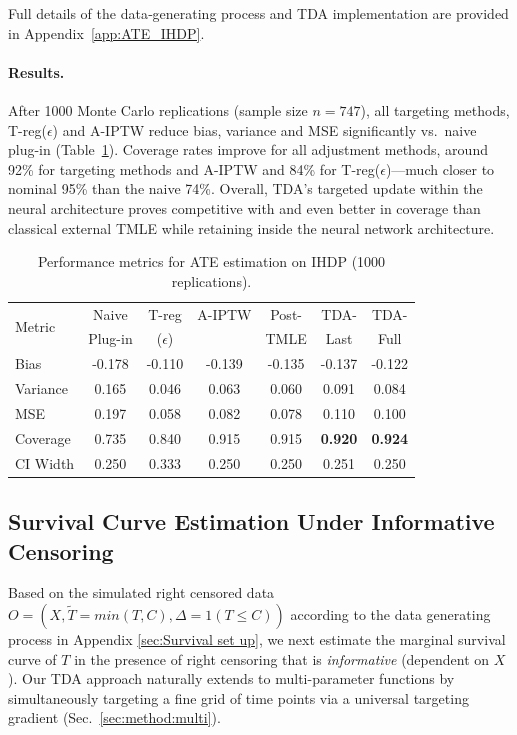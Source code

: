 \documentclass{article}
\theoremstyle{remark}
\begin{document}
Full details of the data‑generating process and TDA implementation are provided in Appendix~\ref{app:ATE_IHDP}.

\paragraph{Results.}
After 1000 Monte Carlo replications (sample size $n=747$), all targeting methods, T-reg($\epsilon$) and A-IPTW reduce bias, variance and MSE significantly vs.\ naive plug-in (Table~\ref{table:ate}). Coverage rates improve for all adjustment methods, around 92\% for targeting methods and A-IPTW and 84\% for T-reg($\epsilon$)—much closer to nominal 95\% than the naive 74\%.  Overall, TDA’s targeted update within the neural architecture proves competitive with and even better in coverage than classical external TMLE while retaining inside the neural network architecture.

\begin{table}[h!]
\centering
\caption{Performance metrics for ATE estimation on IHDP (1000 replications).}
\label{table:ate}
\begin{tabular}{lcccc|cc}
\toprule
\multirow{2}{*}{Metric} & \multicolumn{1}{c}{Naive} & \multicolumn{1}{c}{T-reg} & \multicolumn{1}{c}{A-IPTW} & \multicolumn{1}{c}{Post-} & \multicolumn{1}{c}{TDA-} & \multicolumn{1}{c}{TDA-} \\
& \multicolumn{1}{c}{Plug-in} & \multicolumn{1}{c}{($\epsilon$)} & & \multicolumn{1}{c}{TMLE} & \multicolumn{1}{c}{Last} & \multicolumn{1}{c}{Full} \\
\midrule
Bias     & -0.178 & -0.110 & -0.139 & -0.135 & -0.137 & -0.122 \\
Variance & 0.165 & 0.046 & 0.063 & 0.060 & 0.091 & 0.084 \\
MSE      & 0.197 & 0.058 & 0.082 & 0.078 & 0.110 & 0.100 \\
Coverage & 0.735 & 0.840 & 0.915 & 0.915 & \textbf{0.920} & \textbf{0.924} \\
CI Width & 0.250 & 0.333 & 0.250 & 0.250 & 0.251 & 0.250 \\
\bottomrule
\end{tabular}
\end{table}

\subsection{Survival Curve Estimation Under Informative Censoring}
\label{sec:survival}

Based on the simulated right censored data $O=(X,\tilde{T}=\textit{min}(T,C),\Delta=1(T\leq C))$ according to the data generating process in Appendix \ref{sec:Survival set up}, we next estimate the marginal survival curve of $T$ in the presence of right censoring that is \emph{informative} (dependent on $X$). Our TDA approach naturally extends to multi-parameter functions by simultaneously targeting a fine grid of time points via a universal targeting gradient (Sec.~\ref{sec:method:multi}).
\end{document}

